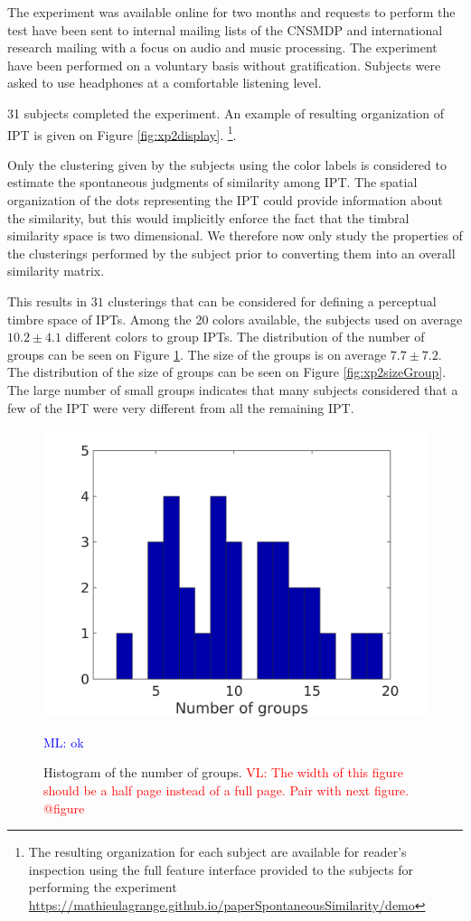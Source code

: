 \documentclass{bmcart}
\newcommand{\ipt}{IPT\xspace}
\newcommand{\ipts}{IPTs\xspace}
\newcommand{\ml}[1]{\textcolor{blue}{ML: #1}}
\newcommand{\vl}[1]{\textcolor{red}{VL: #1}}
\begin{document}
\begin{backmatter}
The experiment was available online for two months and requests to perform the test have been sent to internal mailing lists of the CNSMDP and international research mailing with a focus on audio and music processing. The experiment have been performed on a voluntary basis without gratification. Subjects were asked to use headphones at a comfortable listening level.


31 subjects completed the experiment. An example of resulting organization of \ipt is given on Figure \ref{fig:xp2display}. \footnote{The resulting organization for each subject are available for reader's inspection using the full feature interface provided to the subjects for performing the experiment \url{https://mathieulagrange.github.io/paperSpontaneousSimilarity/demo}}.

Only the clustering given by the subjects using the color labels is considered to estimate the spontaneous judgments of similarity among \ipt. The spatial organization of the dots representing the \ipt could provide information about the similarity, but this would implicitly enforce the fact that the timbral similarity space is two dimensional. We therefore now only study the properties of the clusterings performed by the subject prior to converting them into an overall similarity matrix.

This results in $31$ clusterings that can be considered for defining a perceptual timbre space of \ipts. Among the 20 colors available, the subjects used on average $10.2 \pm  4.1$ different colors to group \ipts. The distribution of the number of groups can be seen on Figure \ref{fig:xp2nbGroup}. The size of the groups is on average $7.7 \pm   7.2$. The distribution of the size of groups can be seen on Figure \ref{fig:xp2sizeGroup}. The large number of small groups indicates that many subjects considered that a few of the \ipt were very different from all the remaining \ipt.

\begin{figure}
\center
\includegraphics[width = \textwidth]{figures/nbc.png}
\caption{Histogram of the number of groups.
\vl{The width of this figure should be a half page instead of a full page. Pair with next figure. @figure}}
\ml{ok}
\label{fig:xp2nbGroup}
\end{figure}


\end{backmatter}
\end{document}
